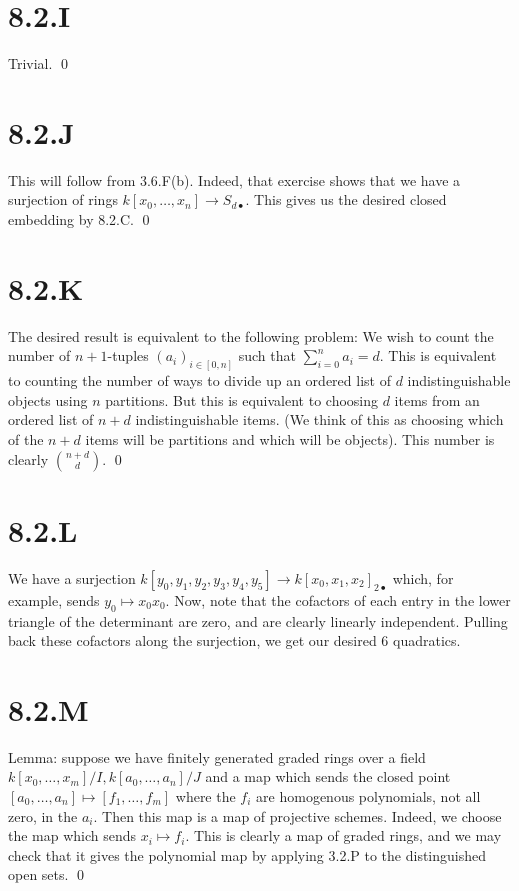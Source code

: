 \documentclass{article}
\begin{document}
\section{8.2.I}
Trivial. \qed

\section{8.2.J}
This will follow from 3.6.F(b). Indeed, that exercise shows that we have a
surjection of rings $k[x_0, \dots, x_n] \to S_{d\bullet}$. This gives us the desired closed
embedding by 8.2.C. \qed

\section{8.2.K}
The desired result is equivalent to the following problem: We wish to count the
number of $n+1$-tuples $(a_i)_{i \in [0, n]}$ such that
$\sum_{i=0}^n a_i = d$. This is equivalent to counting the number of ways to
divide up an ordered list of $d$ indistinguishable objects
using $n$ partitions. But this is equivalent to choosing
$d$ items from an ordered list of $n+d$
indistinguishable items. (We think of this as choosing which of the
$n+d$ items will be partitions and which will be objects).
This number is clearly ${n+d \choose d}$. \qed

\section{8.2.L}
We have a surjection $k[y_0, y_1, y_2, y_3, y_4, y_5] \to k[x_0, x_1, x_2]_{2\bullet}$ which, for example, sends
$y_0 \mapsto x_0x_0$. Now, note that the cofactors of each entry in the
lower triangle of the determinant are zero, and are clearly linearly
independent. Pulling back these cofactors along the surjection, we get our
desired 6 quadratics.

\section{8.2.M}
Lemma: suppose we have finitely generated graded rings over a field
$k[x_0, \dots, x_m]/I, k[a_0, \dots, a_n]/J$ and a map which sends the closed point
$[a_0, \dots, a_n] \mapsto [f_1, \dots, f_m]$ where the $f_i$ are homogenous
polynomials, not all zero, in the $a_i$. Then this map is a
map of projective schemes. Indeed, we choose the map which sends
$x_i \mapsto f_i$. This is clearly a map of graded rings, and we may
check that it gives the polynomial map by applying 3.2.P to the distinguished
open sets. \qed
\end{document}
